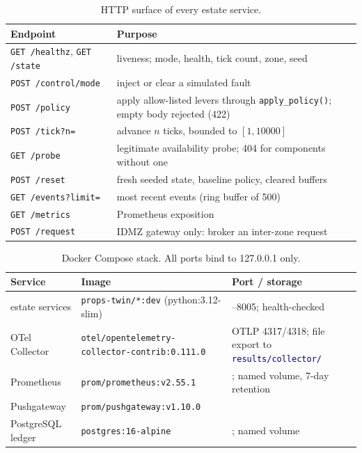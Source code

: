 \documentclass[11pt]{article}
\newcommand{\code}[1]{\texttt{\small #1}}
\newcommand{\file}[1]{\textcolor{navy}{\texttt{\small #1}}}
\begin{document}
\begin{table}[h]
\centering
\caption{HTTP surface of every estate service.}
\label{tab:endpoints}
\small
\begin{tabular}{>{\RaggedRight\arraybackslash}p{4.2cm} >{\RaggedRight\arraybackslash}p{9.4cm}}
\toprule
\textbf{Endpoint} & \textbf{Purpose}\\
\midrule
\code{GET /healthz}, \code{GET /state} & liveness; mode, health, tick count, zone, seed\\
\code{POST /control/mode} & inject or clear a simulated fault\\
\code{POST /policy} & apply allow-listed levers through \code{apply\_policy()}; empty body rejected (422)\\
\code{POST /tick?n=} & advance $n$ ticks, bounded to $[1, 10000]$\\
\code{GET /probe} & legitimate availability probe; 404 for components without one\\
\code{POST /reset} & fresh seeded state, baseline policy, cleared buffers\\
\code{GET /events?limit=} & most recent events (ring buffer of 500)\\
\code{GET /metrics} & Prometheus exposition\\
\code{POST /request} & IDMZ gateway only: broker an inter-zone request\\
\bottomrule
\end{tabular}
\end{table}

\begin{table}[h]
\centering
\caption{Docker Compose stack. All ports bind to 127.0.0.1 only.}
\label{tab:stack}
\small
\begin{tabular}{>{\RaggedRight\arraybackslash}p{2.7cm} >{\RaggedRight\arraybackslash}p{6.6cm} >{\RaggedRight\arraybackslash}p{4.3cm}}
\toprule
\textbf{Service} & \textbf{Image} & \textbf{Port / storage}\\
\midrule
5 estate services & \code{props-twin/*:dev} (python:3.12-slim) & 8001--8005; health-checked\\
OTel Collector & {\scriptsize\texttt{otel/opentelemetry-collector-contrib:0.111.0}} & OTLP 4317/4318; file export to \file{results/collector/}\\
Prometheus & \code{prom/prometheus:v2.55.1} & 9090; named volume, 7-day retention\\
Pushgateway & \code{prom/pushgateway:v1.10.0} & 9091\\
PostgreSQL ledger & \code{postgres:16-alpine} & 55432; named volume\\
\bottomrule
\end{tabular}
\end{table}
\end{document}
